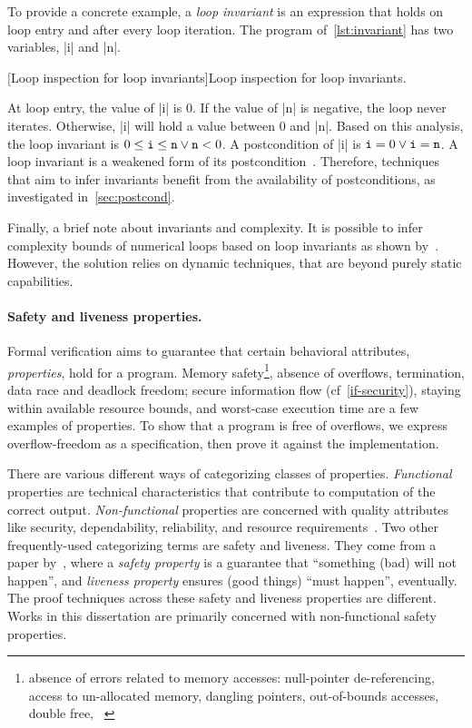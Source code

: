 To provide a concrete example, a \emph{loop invariant} is an expression that holds on loop entry and after every loop iteration.
The program of~\autoref{lst:invariant} has two variables, \pr|i| and \pr|n|.

\begin{center}
\begin{minipage}{\textwidth}
\captionsetup{type=lstlisting}
[Loop inspection for loop invariants]{Loop inspection for loop invariants.}
\label{lst:invariant}
\end{minipage}
\end{center}

At loop entry, the value of \pr|i| is 0.
If the value of \pr|n| is negative, the loop never iterates.
Otherwise, \pr|i| will hold a value between 0 and \pr|n|.
Based on this analysis, the loop invariant is \(0 \leq \prm{i} \leq \prm{n} \vee \prm{n} < 0\).
A postcondition of \pr|i| is \(\prm{i}=0 \vee \prm{i}=\prm{n}\).
A loop invariant is a {weakened} form of its postcondition~\cite{furia2010}.
Therefore, techniques that aim to infer invariants benefit from the availability of postconditions, as investigated in~\autoref{sec:postcond}.

Finally, a brief note about invariants and complexity.
It is possible to infer complexity bounds of numerical loops based on loop invariants as shown by~\textcite{nguyen2017}.
However, the solution relies on dynamic techniques, that are beyond purely static capabilities.

\paragraph*{Safety and liveness properties.}
Formal verification aims to guarantee that certain behavioral attributes, \ie \emph{properties}, hold for a program.
Memory safety\footnote{
\Ie absence of errors related to memory accesses: null-pointer de-referencing, access to un-allocated memory, dangling pointers, out-of-bounds accesses, double free, \etc~\cite{muller2024}},
absence of overflows, termination, data race and deadlock freedom;
secure information flow (cf~\autoref{if-security}), staying within available resource bounds, and worst-case execution time are a few examples of properties.
To show that a program is free of \eg overflows, we express {overflow-freedom} as a specification,
then prove it against the implementation.

There are various different ways of categorizing classes of properties.
\emph{Functional} properties are technical characteristics that contribute to computation of the correct output.
\emph{Non-functional} properties are concerned with quality attributes like security, dependability, reliability, and resource requirements~\cite{terbeek2018}.
Two other frequently-used categorizing terms are safety and liveness.
They come from a paper by~\textcite{lamport1977}, where
a \emph{safety property} is a guarantee that \enquote{something (bad) will not happen},
and \emph{liveness property} ensures (good things) \enquote{must happen}, eventually.
The proof techniques across these safety and liveness properties are different.
Works in this dissertation are primarily concerned with non-functional safety properties.

